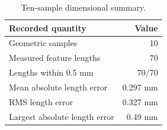 \begin{table}[!htbp]\centering\small
\begin{tabular}{lr}
\toprule Recorded quantity & Value\\\midrule
Geometric samples & 10\\
Measured feature lengths & 70\\
Lengths within 0.5 mm & 70/70\\
Mean absolute length error & 0.297 mm\\
RMS length error & 0.327 mm\\
Largest absolute length error & 0.49 mm\\
\bottomrule\end{tabular}
\caption{Ten-sample dimensional summary.}\label{tab:res-gantry-summary}\end{table}
